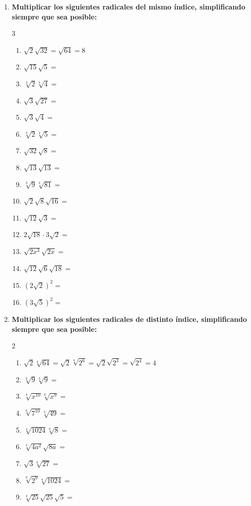 \documentclass[10pt, a4paper]{article}
\begin{document}
\begin{enumerate}
    \item \textbf{Multiplicar los siguientes radicales del mismo índice, simplificando siempre que sea posible:}
    \begin{multicol}{3}
    \begin{enumerate}[label=\alph*)]
        \item $\sqrt{2}\sqrt{32} = \sqrt{64} = 8$
        \item $\sqrt{15}\sqrt{5} =$
        \item $\sqrt[3]{2}\sqrt[3]{4} =$
        \item $\sqrt{3}\sqrt{27} =$
        \item $\sqrt{3}\sqrt{4} =$
        \item $\sqrt[3]{2}\sqrt[3]{5} =$
        \item $\sqrt{32}\sqrt{8} =$
        \item $\sqrt{13}\sqrt{13} =$
        \item $\sqrt[3]{9}\sqrt[3]{81} =$
        \item $\sqrt{2}\sqrt{8}\sqrt{16} =$
        \item $\sqrt{12}\sqrt{3} =$
        \item $2\sqrt{18} \cdot 3\sqrt{2} =$
        \item $\sqrt{2x^3}\sqrt{2x} =$
        \item $\sqrt{12}\sqrt{6}\sqrt{18} =$
        \item $(2\sqrt{2})^2 =$
        \item $(3\sqrt{5})^2 =$
    \end{enumerate}
    \end{multicol}

    \item \textbf{Multiplicar los siguientes radicales de distinto índice, simplificando siempre que sea posible:}
    \begin{multicol}{2}
    \begin{enumerate}[label=\alph*)]
        \item $\sqrt{2}\sqrt[4]{64} = \sqrt{2}\sqrt[4]{2^6} = \sqrt{2}\sqrt{2^3} = \sqrt{2^4} = 4$
        \item $\sqrt[6]{9}\sqrt[3]{9} =$
        \item $\sqrt[4]{x^{10}}\sqrt[6]{x^9} =$
        \item $\sqrt[6]{7^{10}}\sqrt[3]{49} =$
        \item $\sqrt[4]{1024}\sqrt[6]{8} =$
        \item $\sqrt[4]{4a^2}\sqrt{8a} =$
        \item $\sqrt{3}\sqrt[6]{27} =$
        \item $\sqrt[6]{2^9}\sqrt[4]{1024} =$
        \item $\sqrt[4]{25}\sqrt{25}\sqrt{5} =$
    \end{enumerate}
    \end{multicol}


\end{enumerate}
\end{document}
